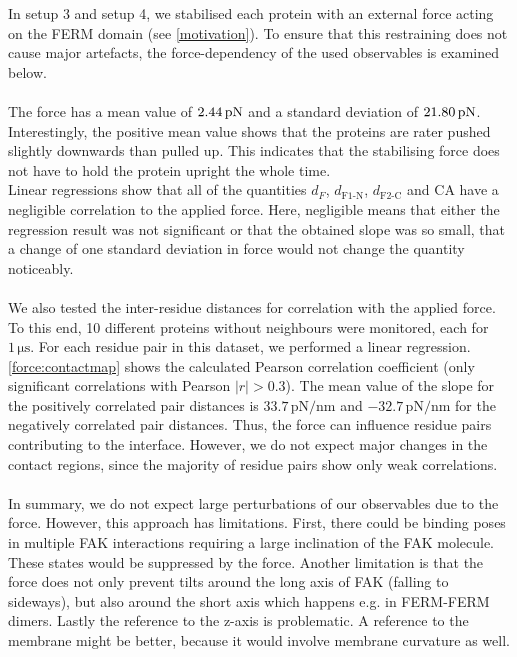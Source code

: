 \label{forceana}
In setup 3 and setup 4, we stabilised each protein with an external force acting on the FERM domain (see \autoref{motivation}). To ensure that this restraining does not cause major artefacts, the force-dependency of the used observables is examined below.\\
\\
The force has a mean value of $2.44\,\forceunit$ and a standard deviation of $21.80\,\forceunit$. Interestingly, the positive mean value shows that the proteins are rater pushed slightly downwards than pulled up. This indicates that the stabilising force does not have to hold the protein upright the whole time. %
\\
Linear regressions show that all of the quantities $d_F$, $d_\text{F1-N}$, $d_\text{F2-C}$ and CA have a negligible correlation to the applied force. Here, negligible means that either the regression result was not significant or that the obtained slope was so small, that a change of one standard deviation in force would not change the quantity noticeably.\\
\\
We also tested the inter-residue distances for correlation with the applied force. To this end, 10 different proteins without neighbours were monitored, each for $1\,\si{\micro\second}$. For each residue pair in this dataset, we performed a linear regression. \autoref{force:contactmap} shows the calculated Pearson correlation coefficient (only significant correlations with Pearson $\left|r\right| > 0.3$). The mean value of the slope for the positively correlated pair distances is $33.7\,\si{\pico\newton/\nano\metre}$ and $-32.7\,\si{\pico\newton/\nano\metre}$ for the negatively correlated pair distances. Thus, the force can influence residue pairs contributing to the interface. However, we do not expect major changes in the contact regions, since the majority of residue pairs show only weak correlations.\\
\\
In summary, we do not expect large perturbations of our observables due to the force. However, this approach has limitations. First, there could be binding poses in multiple FAK interactions requiring a large inclination of the FAK molecule. These states would be suppressed by the force. Another limitation is that the force does not only prevent tilts around the long axis of FAK (falling to sideways), but also around the short axis which happens e.g. in FERM-FERM dimers. Lastly the reference to the z-axis is problematic. A reference to the membrane might be better, because it would involve membrane curvature as well.
